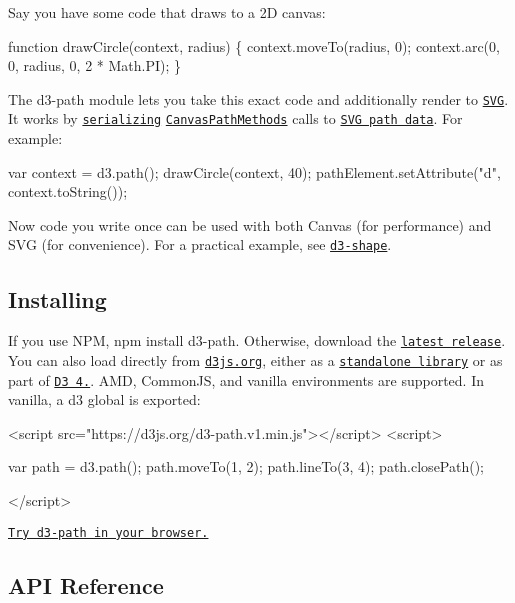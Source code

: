 Say you have some code that draws to a 2D canvas\+:


\begin{DoxyCode}
function drawCircle(context, radius) \{
  context.moveTo(radius, 0);
  context.arc(0, 0, radius, 0, 2 * Math.PI);
\}
\end{DoxyCode}


The d3-\/path module lets you take this exact code and additionally render to \href{http://www.w3.org/TR/SVG/paths.html}{\tt S\+VG}. It works by \href{#path_toString}{\tt serializing} \href{http://www.w3.org/TR/2dcontext/#canvaspathmethods}{\tt Canvas\+Path\+Methods} calls to \href{http://www.w3.org/TR/SVG/paths.html#PathData}{\tt S\+VG path data}. For example\+:


\begin{DoxyCode}
var context = d3.path();
drawCircle(context, 40);
pathElement.setAttribute("d", context.toString());
\end{DoxyCode}


Now code you write once can be used with both Canvas (for performance) and S\+VG (for convenience). For a practical example, see \href{https://github.com/d3/d3-shape}{\tt d3-\/shape}.

\subsection*{Installing}

If you use N\+PM, {\ttfamily npm install d3-\/path}. Otherwise, download the \href{https://github.com/d3/d3-path/releases/latest}{\tt latest release}. You can also load directly from \href{https://d3js.org}{\tt d3js.\+org}, either as a \href{https://d3js.org/d3-path.v1.min.js}{\tt standalone library} or as part of \href{https://github.com/d3/d3}{\tt D3 4.}. A\+MD, Common\+JS, and vanilla environments are supported. In vanilla, a {\ttfamily d3} global is exported\+:


\begin{DoxyCode}
<script src="https://d3js.org/d3-path.v1.min.js"></script>
<script>

var path = d3.path();
path.moveTo(1, 2);
path.lineTo(3, 4);
path.closePath();

</script>
\end{DoxyCode}


\href{https://tonicdev.com/npm/d3-path}{\tt Try d3-\/path in your browser.}

\subsection*{A\+PI Reference}

